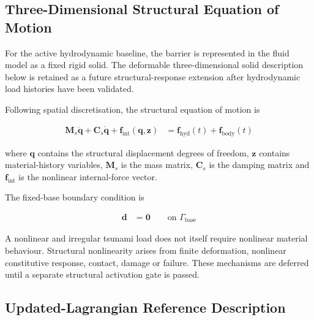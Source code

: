 %

\subsection{Three-Dimensional Structural Equation of Motion}
\label{subsec:res_str_rsp_three_dimensional_eom}

For the active hydrodynamic baseline, the barrier is represented in
the fluid model as a fixed rigid solid. The deformable three-dimensional
solid description below is retained as a future structural-response
extension after hydrodynamic load histories have been validated.

Following spatial discretisation, the structural equation of motion is

\begin{align}
\bm{M}_{s}\ddot{\bm{q}}
+
\bm{C}_{s}\dot{\bm{q}}
+
\bm{f}_{\mathrm{int}}\!\left(\bm{q},\bm{z}\right)
&=
\bm{f}_{\mathrm{hyd}}(t)
+
\bm{f}_{\mathrm{body}}(t)
\label{eq:res_str_rsp_structural_eom}
\end{align}

where \(\bm{q}\) contains the structural displacement degrees of freedom, \(\bm{z}\) contains material-history variables, \(\bm{M}_{s}\) is the mass matrix, \(\bm{C}_{s}\) is the damping matrix and \(\bm{f}_{\mathrm{int}}\) is the nonlinear internal-force vector.

The fixed-base boundary condition is

\begin{align}
\bm{d}
&=
\bm{0}
\qquad
\text{on }\Gamma_{\mathrm{base}}
\label{eq:res_str_rsp_fixed_base_boundary}
\end{align}

A nonlinear and irregular tsunami load does not itself require nonlinear material behaviour. Structural nonlinearity arises from finite deformation, nonlinear constitutive response, contact, damage or failure. These mechanisms are deferred until a separate structural activation gate is passed.

\subsection{Updated-Lagrangian Reference Description}
\label{subsec:res_str_rsp_updated_lagrangian}

